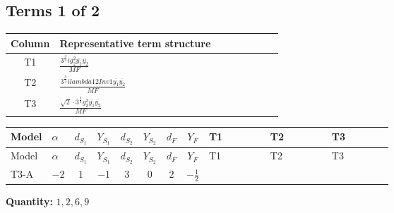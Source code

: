 \documentclass[8pt]{article}
\begin{document}
\begin{landscape}
\subsection*{Terms 1 of 2}
\begin{center}
\begin{tabular}{@{}c >{\raggedright\arraybackslash}p{0.82\linewidth}@{}}
\toprule
Column & Representative term structure \\
\midrule
T1 & \(\displaystyle \frac{3^{\frac{3}{4}} i g_{2}^{2} \overline{y_{1}} \overline{y_{2}}}{MF}\) \\
\midrule
T2 & \(\displaystyle \frac{3^{\frac{3}{4}} i lambda12Inv1 \overline{y_{1}} \overline{y_{2}}}{MF}\) \\
\midrule
T3 & \(\displaystyle \frac{\sqrt{2} \cdot 3^{\frac{3}{4}} g_{2}^{2} \overline{y_{1}} \overline{y_{2}}}{MF}\) \\
\midrule
\bottomrule
\end{tabular}
\end{center}
\smallskip
\tiny
\begin{longtable}{@{}llcccccc >{\raggedright\arraybackslash}p{0.21\linewidth} >{\raggedright\arraybackslash}p{0.21\linewidth} >{\raggedright\arraybackslash}p{0.21\linewidth}@{}}
\toprule
Model & $\alpha$ & $d_{S_1}$ & $Y_{S_1}$ & $d_{S_2}$ & $Y_{S_2}$ & $d_F$ & $Y_F$ & T1 & T2 & T3 \\
\midrule
\endfirsthead
\toprule
Model & $\alpha$ & $d_{S_1}$ & $Y_{S_1}$ & $d_{S_2}$ & $Y_{S_2}$ & $d_F$ & $Y_F$ & T1 & T2 & T3 \\
\midrule
\endhead
T3-A & $-2$ & $1$ & $-1$ & $3$ & $0$ & $2$ & $-\frac{1}{2}$ & \scriptsize\adjustbox{max width=\linewidth}{$\begin{gathered} - \frac{25 \cdot 3^{\frac{3}{4}} i g_{2}^{2} \overline{y_{1}} \overline{y_{2}}}{24 MF}\end{gathered}$} & \scriptsize\adjustbox{max width=\linewidth}{$\begin{gathered} - \frac{3^{\frac{3}{4}} i lambda12Inv1 \overline{y_{1}} \overline{y_{2}}}{6 MF}\end{gathered}$} & \scriptsize\adjustbox{max width=\linewidth}{$\begin{gathered} - \frac{\sqrt{2} \cdot 3^{\frac{3}{4}} g_{2}^{2} \overline{y_{1}} \overline{y_{2}}}{6 MF}\end{gathered}$} \\
\midrule
\bottomrule
\end{longtable}
\clearpage
\noindent\textbf{Quantity: }$\mathrm{1,2,6,9}$\par\smallskip

\end{landscape}
\end{document}
